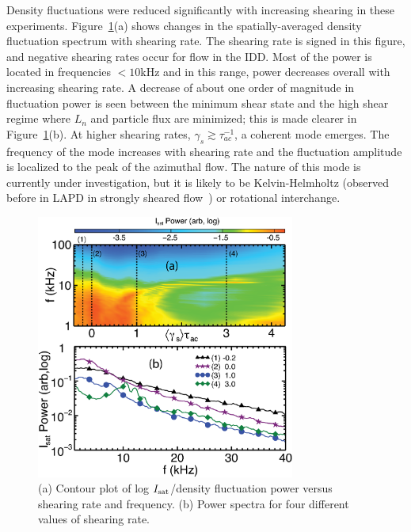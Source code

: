 \documentclass[aps,prl,amsmath,amssymb,preprint,superscriptaddress]{revtex4} %
\begin{document}
Density fluctuations were reduced significantly with increasing
shearing in these experiments.  Figure~\ref{fig:powercontour}(a) shows
changes in the spatially-averaged density fluctuation spectrum with
shearing rate.  The shearing rate is signed in this figure, and
negative shearing rates occur for flow in the IDD. Most of the power
is located in frequencies $<10$kHz and in this range, power decreases
overall with increasing shearing rate.  A decrease of about one order
of magnitude in fluctuation power is seen between the minimum shear
state and the high shear regime where $L_n$ and particle flux are
minimized; this is made clearer in Figure~\ref{fig:powercontour}(b).
At higher shearing rates, $\gamma_{s} \gtrsim \tau_{ac}^{-1}$, a
coherent mode emerges.  The frequency of the mode increases with
shearing rate and the fluctuation amplitude is localized to the peak
of the azimuthal flow.  The nature of this mode is currently under
investigation, but it is likely to be Kelvin-Helmholtz (observed before in
LAPD in strongly sheared flow~\cite{horton05}) or rotational
interchange.

\begin{figure}[!htbp]
\centerline{
\includegraphics[width=8.5cm]{figure4.eps}}
\caption{\label{fig:powercontour} (a) Contour plot of log $I_{\rm sat}$/density fluctuation power versus shearing rate and frequency. (b) Power spectra for four different values of shearing rate.}
\end{figure}
\end{document}
